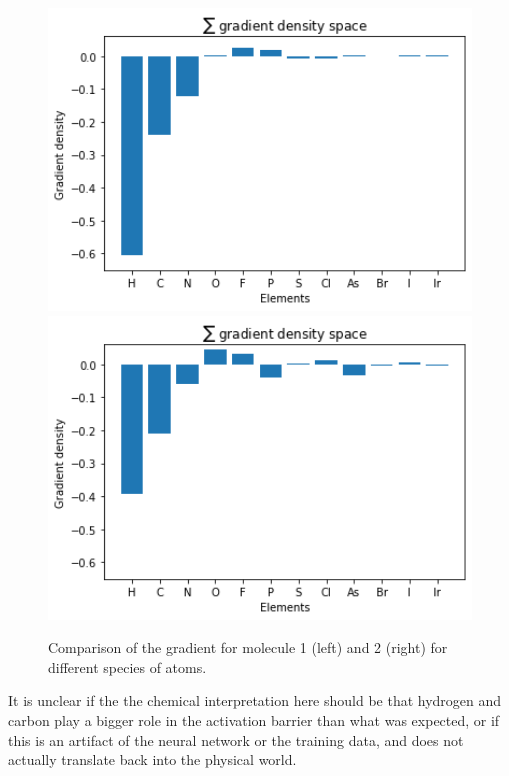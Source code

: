 \begin{figure}[!htb]
    \includegraphics[width=1.0\textwidth]{figures/evaluation/elem2-GRAD.png}
  \endminipage\hfill
    \includegraphics[width=1.0\textwidth]{figures/evaluation/elem1-GRAD.png}
  \endminipage\hfill
  \caption[Comparison of summed gradients]{
    Comparison of the gradient for molecule 1 (left) and 2 (right) for different species of atoms.
  }
  \label{fig:snap_global_gradient}

\end{figure}


It is unclear if the the chemical interpretation here should be that hydrogen and carbon play a bigger role in the activation
barrier than what was expected, or if this is an artifact of the neural network or the training data, and does not actually translate back into 
the physical world.

